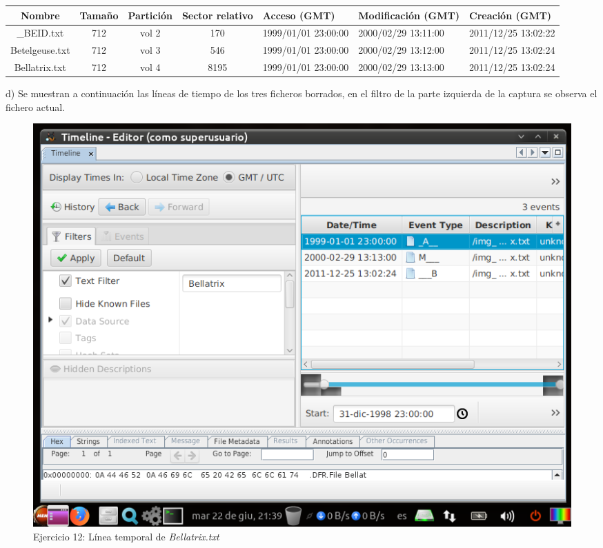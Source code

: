 \documentclass[11pt]{article}
\begin{document}
\begin{table}[H]
    \centering
    \begin{tabular}{|c|c|c|c|p{2cm}|p{2cm}|p{2cm}|}
        \hline
        Nombre & Tamaño & Partición & Sector relativo & Acceso (GMT) & Modificación (GMT) & Creación (GMT) \\
        \hline\hline
        \_BEID.txt & 712 & vol 2 & 170 & 1999/01/01 23:00:00 & 2000/02/29 13:11:00 & 2011/12/25 13:02:22 \\
        \hline
        Betelgeuse.txt & 712 & vol 3 & 546 & 1999/01/01 23:00:00 & 2000/02/29 13:12:00 & 2011/12/25 13:02:24 \\
        \hline
        Bellatrix.txt & 712 & vol 4 & 8195 & 1999/01/01 23:00:00 & 2000/02/29 13:13:00 & 2011/12/25 13:02:24 \\
        \hline
    \end{tabular}
\end{table}

d) Se muestran a continuación las líneas de tiempo de los tres ficheros borrados, en el filtro de la parte izquierda de la captura se observa el fichero actual.

\begin{figure}[H]
    \caption{Ejercicio 12: Línea temporal de \textit{Bellatrix.txt}}
    \centering
    \includegraphics[scale=0.7]{e12-8.png}
\end{figure}
\end{document}
